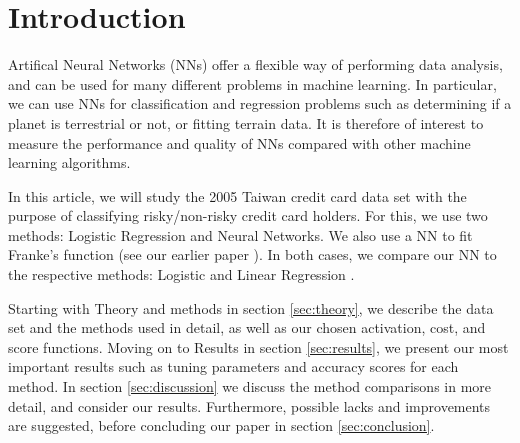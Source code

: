 \section{Introduction}
\label{sec:introduction}

Artifical Neural Networks (NNs) offer a flexible way of performing data analysis, and can be used
for many different problems in machine learning. In particular, we can use NNs for
classification and regression problems such as determining if a planet is terrestrial
or not, or fitting terrain data. It is therefore of interest to measure the performance
and quality of NNs compared with other machine learning algorithms.

In this article, we will study the 2005 Taiwan credit card data set \citep{yeh2009UCI} with the purpose
of classifying risky/non-risky credit card holders. For this, we use two methods:
Logistic Regression and Neural Networks. We also use a NN to fit Franke's function (see our earlier paper \citet{prosjekt1}). In both cases, we compare
our NN to the respective methods: Logistic and Linear Regression \citep{prosjekt1}.

Starting with Theory and methods in section \ref{sec:theory}, we describe the data set and
the methods used in detail, as well as our chosen activation, cost, and score functions.
Moving on to Results in section \ref{sec:results}, we present our most important results such as
tuning parameters and accuracy scores for each method. In section \ref{sec:discussion}
we discuss the method comparisons in more detail, and consider our results. Furthermore,
possible lacks and improvements are suggested, before concluding our paper in section
\ref{sec:conclusion}.
